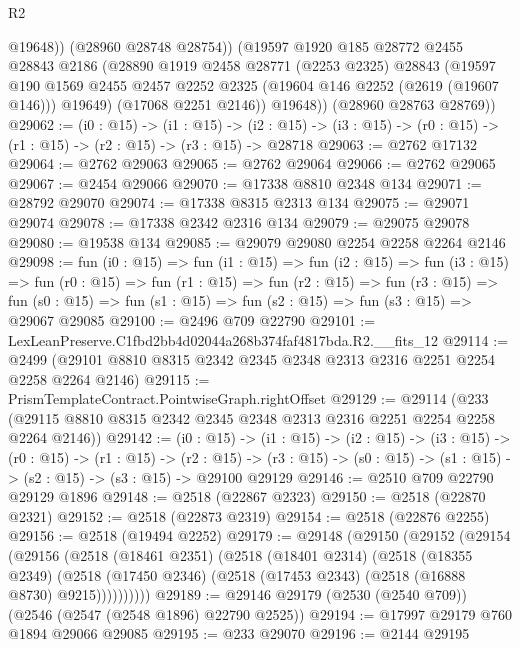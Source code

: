 \begin{lexlean}{R2}
\begin{coremodule}
              @19648))
          (@28960 @28748 @28754))
        (@19597
          @1920
          @185
          @28772
          @2455
          @28843
          @2186
          (@28890
            @1919
            @2458
            @28771
            (@2253 @2325)
            @28843
            (@19597
              @190
              @1569
              @2455
              @2457
              @2252
              @2325
              (@19604 @146 @2252 (@2619 (@19607 @146)))
              @19649)
            (@17068 @2251 @2146))
          @19648))
      (@28960 @28763 @28769))
@29062 := (i0 : @15) ->
  (i1 : @15) ->
  (i2 : @15) -> (i3 : @15) -> (r0 : @15) -> (r1 : @15) -> (r2 : @15) -> (r3 : @15) -> @28718
@29063 := @2762 @17132
@29064 := @2762 @29063
@29065 := @2762 @29064
@29066 := @2762 @29065
@29067 := @2454 @29066
@29070 := @17338 @8810 @2348 @134
@29071 := @28792 @29070
@29074 := @17338 @8315 @2313 @134
@29075 := @29071 @29074
@29078 := @17338 @2342 @2316 @134
@29079 := @29075 @29078
@29080 := @19538 @134
@29085 := @29079 @29080 @2254 @2258 @2264 @2146
@29098 := fun (i0 : @15) =>
  fun (i1 : @15) =>
  fun (i2 : @15) =>
  fun (i3 : @15) =>
  fun (r0 : @15) =>
  fun (r1 : @15) =>
  fun (r2 : @15) =>
  fun (r3 : @15) =>
  fun (s0 : @15) => fun (s1 : @15) => fun (s2 : @15) => fun (s3 : @15) => @29067 @29085
@29100 := @2496 @709 @22790
@29101 := LexLeanPreserve.C1fbd2bb4d02044a268b374faf4817bda.R2.__fits_12
@29114 := @2499 (@29101 @8810 @8315 @2342 @2345 @2348 @2313 @2316 @2251 @2254 @2258 @2264 @2146)
@29115 := PrismTemplateContract.PointwiseGraph.rightOffset
@29129 := @29114
    (@233 (@29115 @8810 @8315 @2342 @2345 @2348 @2313 @2316 @2251 @2254 @2258 @2264 @2146))
@29142 := (i0 : @15) ->
  (i1 : @15) ->
  (i2 : @15) ->
  (i3 : @15) ->
  (r0 : @15) ->
  (r1 : @15) ->
  (r2 : @15) -> (r3 : @15) -> (s0 : @15) -> (s1 : @15) -> (s2 : @15) -> (s3 : @15) -> @29100 @29129
@29146 := @2510 @709 @22790 @29129 @1896
@29148 := @2518 (@22867 @2323)
@29150 := @2518 (@22870 @2321)
@29152 := @2518 (@22873 @2319)
@29154 := @2518 (@22876 @2255)
@29156 := @2518 (@19494 @2252)
@29179 := @29148
    (@29150
      (@29152
        (@29154
          (@29156
            (@2518
              (@18461 @2351)
              (@2518
                (@18401 @2314)
                (@2518
                  (@18355 @2349)
                  (@2518 (@17450 @2346) (@2518 (@17453 @2343) (@2518 (@16888 @8730) @9215))))))))))
@29189 := @29146 @29179 (@2530 (@2540 @709)) (@2546 (@2547 (@2548 @1896) @22790 @2525))
@29194 := @17997 @29179 @760 @1894 @29066 @29085
@29195 := @233 @29070
@29196 := @2144 @29195

\end{coremodule}
\end{lexlean}
